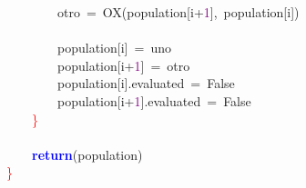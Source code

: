 \mbox{}\ \ \ \ \ \ \ \ otro\ \textcolor{BrickRed}{=}\ OX\textcolor{BrickRed}{(}population\textcolor{BrickRed}{[}i\textcolor{BrickRed}{+}\textcolor{Purple}{1}\textcolor{BrickRed}{],}\ population\textcolor{BrickRed}{[}i\textcolor{BrickRed}{])} \\
\mbox{} \\
\mbox{}\ \ \ \ \ \ \ \ population\textcolor{BrickRed}{[}i\textcolor{BrickRed}{]}\ \textcolor{BrickRed}{=}\ uno \\
\mbox{}\ \ \ \ \ \ \ \ population\textcolor{BrickRed}{[}i\textcolor{BrickRed}{+}\textcolor{Purple}{1}\textcolor{BrickRed}{]}\ \textcolor{BrickRed}{=}\ otro \\
\mbox{}\ \ \ \ \ \ \ \ population\textcolor{BrickRed}{[}i\textcolor{BrickRed}{].}evaluated\ \textcolor{BrickRed}{=}\ False \\
\mbox{}\ \ \ \ \ \ \ \ population\textcolor{BrickRed}{[}i\textcolor{BrickRed}{+}\textcolor{Purple}{1}\textcolor{BrickRed}{].}evaluated\ \textcolor{BrickRed}{=}\ False \\
\mbox{}\ \ \ \ \textcolor{Red}{\}} \\
\mbox{} \\
\mbox{}\ \ \ \ \textbf{\textcolor{Blue}{return}}\textcolor{BrickRed}{(}population\textcolor{BrickRed}{)} \\
\mbox{}\textcolor{Red}{\}} \\
\mbox{}
